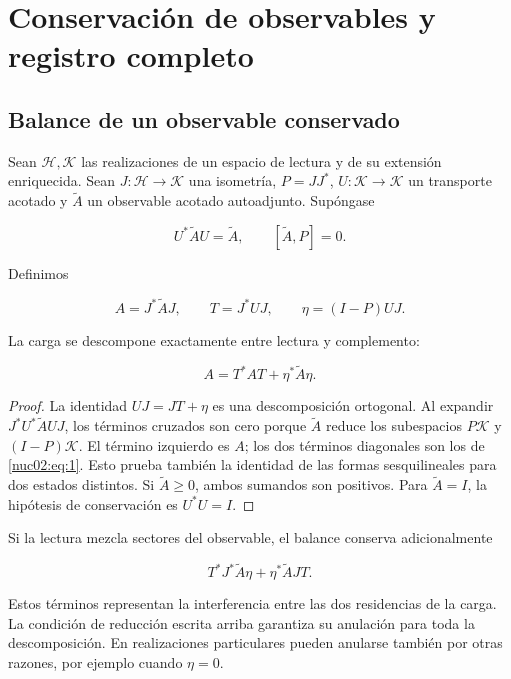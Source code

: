 \section{Conservación de observables y registro completo}
\label{nuclear:2}
\subsection{Balance de un observable conservado}

Sean \(\mathcal H,\mathcal K\) las realizaciones de un espacio de lectura y de su extensión enriquecida. Sean \(J:\mathcal H\to\mathcal K\) una isometría, \(P=JJ^*\), \(U:\mathcal K\to\mathcal K\) un transporte acotado y \(\widetilde A\) un observable acotado autoadjunto. Supóngase

\[
U^*\widetilde A U=\widetilde A,\qquad [\widetilde A,P]=0.
\]

Definimos

\[
A=J^*\widetilde A J,\qquad T=J^*UJ,
\qquad \eta=(I-P)UJ.
\]

\begin{proposition}
\label{nuc02:balance}
La carga se descompone exactamente entre lectura y complemento:

\begin{equation}
\boxed{A=T^*AT+\eta^*\widetilde A\eta.}\label{nuc02:eq:1}
\end{equation}
\end{proposition}

\begin{proof}
La identidad \(UJ=JT+\eta\) es una descomposición ortogonal. Al expandir \(J^*U^*\widetilde A UJ\), los términos cruzados son cero porque \(\widetilde A\) reduce los subespacios \(P\mathcal K\) y \((I-P)\mathcal K\). El término izquierdo es \(A\); los dos términos diagonales son los de \eqref{nuc02:eq:1}. Esto prueba también la identidad de las formas sesquilineales para dos estados distintos. Si \(\widetilde A\geq0\), ambos sumandos son positivos. Para \(\widetilde A=I\), la hipótesis de conservación es \(U^*U=I\).
\end{proof}

Si la lectura mezcla sectores del observable, el balance conserva adicionalmente

\[
T^*J^*\widetilde A\eta+\eta^*\widetilde A JT.
\]

Estos términos representan la interferencia entre las dos residencias de la carga. La condición de reducción escrita arriba garantiza su anulación para toda la descomposición. En realizaciones particulares pueden anularse también por otras razones, por ejemplo cuando \(\eta=0\).

